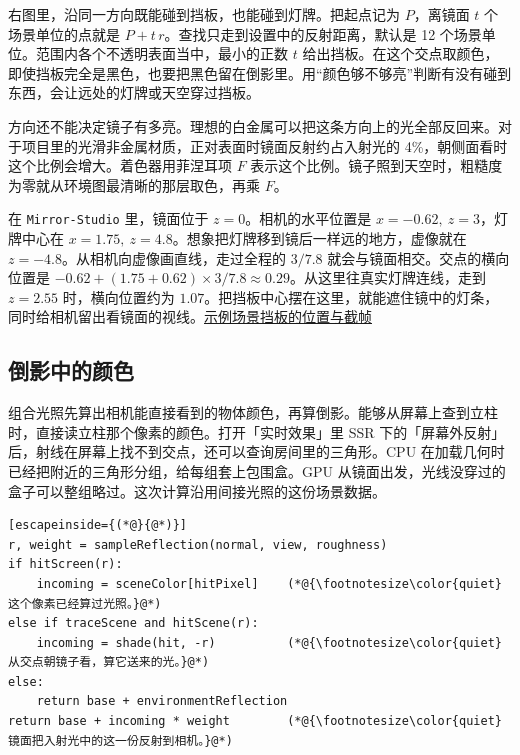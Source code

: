 右图里，沿同一方向既能碰到挡板，也能碰到灯牌。把起点记为 $P$，离镜面 $t$ 个场景单位的点就是 $P+t\,r$。查找只走到设置中的反射距离，默认是 12 个场景单位。范围内各个不透明表面当中，最小的正数 $t$ 给出挡板。在这个交点取颜色，即使挡板完全是黑色，也要把黑色留在倒影里。用“颜色够不够亮”判断有没有碰到东西，会让远处的灯牌或天空穿过挡板。

方向还不能决定镜子有多亮。理想的白金属可以把这条方向上的光全部反回来。对于项目里的光滑非金属材质，正对表面时镜面反射约占入射光的 4\%，朝侧面看时这个比例会增大。着色器用菲涅耳项 $F$ 表示这个比例。镜子照到天空时，粗糙度为零就从环境图最清晰的那层取色，再乘 $F$。

在 \texttt{Mirror-Studio} 里，镜面位于 $z=0$。相机的水平位置是 $x=-0.62,\ z=3$，灯牌中心在 $x=1.75,\ z=4.8$。想象把灯牌移到镜后一样远的地方，虚像就在 $z=-4.8$。从相机向虚像画直线，走过全程的 $3/7.8$ 就会与镜面相交。交点的横向位置是 $-0.62+(1.75+0.62)\times3/7.8\approx0.29$。从这里往真实灯牌连线，走到 $z=2.55$ 时，横向位置约为 $1.07$。把挡板中心摆在这里，就能遮住镜中的灯条，同时给相机留出看镜面的视线。\href{run:../../RedflagForge/assets/scenes/Mirror-Studio.redflag}{示例场景}\quad\href{run:../../tests/check_scene_reflections.py}{挡板的位置与截帧}

\clearpage
\subsection{倒影中的颜色}

组合光照先算出相机能直接看到的物体颜色，再算倒影。能够从屏幕上查到立柱时，直接读立柱那个像素的颜色。打开「实时效果」里 SSR 下的「屏幕外反射」后，射线在屏幕上找不到交点，还可以查询房间里的三角形。CPU 在加载几何时已经把附近的三角形分组，给每组套上包围盒。GPU 从镜面出发，光线没穿过的盒子可以整组略过。这次计算沿用间接光照的这份场景数据。

\par\nopagebreak
\begin{lstlisting}[escapeinside={(*@}{@*)}]
r, weight = sampleReflection(normal, view, roughness)
if hitScreen(r):
    incoming = sceneColor[hitPixel]    (*@{\footnotesize\color{quiet}这个像素已经算过光照。}@*)
else if traceScene and hitScene(r):
    incoming = shade(hit, -r)          (*@{\footnotesize\color{quiet}从交点朝镜子看，算它送来的光。}@*)
else:
    return base + environmentReflection
return base + incoming * weight        (*@{\footnotesize\color{quiet}镜面把入射光中的这一份反射到相机。}@*)
\end{lstlisting}

